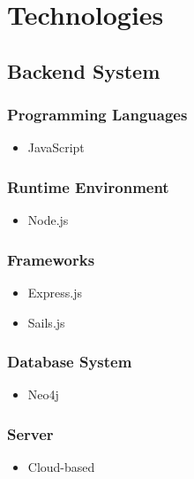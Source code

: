 \documentclass[11pt,fleqn]{book} %
\begin{document}
	
	
	
	\chapter{Technologies}
	
	\section{Backend System}
	\subsection{Programming Languages}
	\begin{itemize}
		\item JavaScript
	\end{itemize}
	\subsection{Runtime Environment}
	\begin{itemize}
		\item Node.js
	\end{itemize}
	\subsection{Frameworks}
	\begin{itemize}
		\item Express.js
		\item Sails.js
	\end{itemize}
	\subsection{Database System}
	\begin{itemize}
		\item Neo4j
	\end{itemize}
	\subsection{Server}
	\begin{itemize}
		\item Cloud-based
	\end{itemize}
\end{document}
